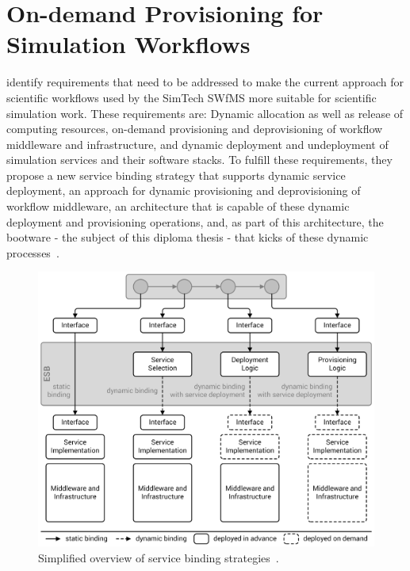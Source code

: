 \section{On-demand Provisioning for Simulation Workflows}
\label{previous:ondemand}

\citeauthor{provisioning:ondemand} identify requirements that need to be addressed to make the current approach for scientific workflows used by the SimTech SWfMS more suitable for scientific simulation work.
These requirements are: Dynamic allocation as well as release of computing resources, on-demand provisioning and deprovisioning of workflow middleware and infrastructure, and dynamic deployment and undeployment of simulation services and their software stacks.
To fulfill these requirements, they propose a new service binding strategy that supports dynamic service deployment, an approach for dynamic provisioning and deprovisioning of workflow middleware, an architecture that is capable of these dynamic deployment and provisioning operations, and, as part of this architecture, the bootware - the subject of this diploma thesis - that kicks of these dynamic processes~\autocite{provisioning:ondemand}.

\begin{figure}[!htbp]
	\centering
	\includegraphics[resolution=600]{previous/assets/service_binding_strategies}
	\caption{Simplified overview of service binding strategies~\autocite[based on][]{provisioning:ondemand}.}
	\label{image:service_binding_strategies}
\end{figure}

